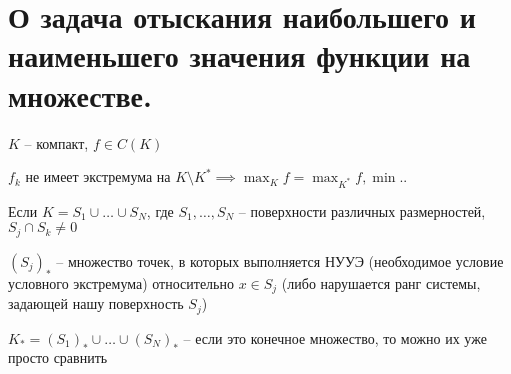 \documentclass{book}
\theoremstyle{definition}
\begin{document}
   \section{О задача отыскания наибольшего и наименьшего значения функции на множестве.}

   $K$ -- компакт,  $f\in C(K)$

   $f_k$ не имеет экстремума на $K \setminus  K^* \implies \max_K f = \max _{K^*}f, \min..$


    Если $K = S_1\cup \ldots\cup S_N$, где $S_1, \ldots, S_N$ -- поверхности различных размерностей, $S_j\cap S_k \neq 0$

    $\left( S_j \right) _*$ -- множество точек, в которых выполняется НУУЭ (необходимое условие условного экстремума) относительно $x\in S_j$ (либо нарушается ранг системы, задающей нашу поверхность  $S_j$)

    $K_* = \left( S_1 \right) _* \cup \ldots \cup \left( S_N \right) _*$ -- если это конечное множество, то можно их уже просто сравнить
\end{document}
